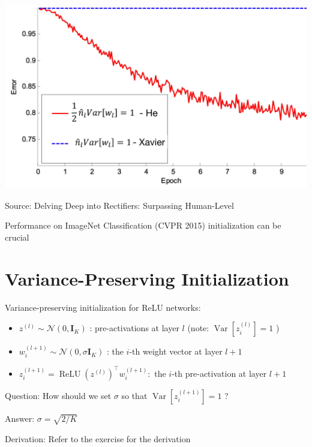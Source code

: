 \documentclass[10pt]{article}
\begin{document}
\begin{center}
\includegraphics[max width=\textwidth]{2023_12_30_360102aa01a03e5a4270g-22}
\end{center}

Source: Delving Deep into Rectifiers: Surpassing Human-Level

Performance on ImageNet Classification (CVPR 2015) initialization can be crucial

\section*{Variance-Preserving Initialization}
Variance-preserving initialization for ReLU networks:

\begin{itemize}
  \item $z^{(l)} \sim \mathcal{N}\left(0, \mathbf{I}_{K}\right)$ : pre-activations at layer $l$ (note: $\operatorname{Var}\left[z_{i}^{(l)}\right]=1$ )

  \item $w_{i}^{(l+1)} \sim \mathcal{N}\left(0, \sigma \mathbf{I}_{K}\right)$ : the $i$-th weight vector at layer $l+1$

  \item $z_{i}^{(l+1)}=\operatorname{ReLU}\left(z^{(l)}\right)^{\top} w_{i}^{(l+1)}:$ the $i$-th pre-activation at layer $l+1$

\end{itemize}

Question: How should we set $\sigma$ so that $\operatorname{Var}\left[z_{i}^{(l+1)}\right]=1$ ?

Answer: $\sigma=\sqrt{2 / K}$

Derivation: Refer to the exercise for the derivation
\end{document}
